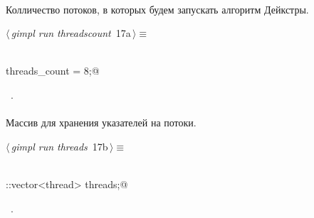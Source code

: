 \documentclass[12pt]{article}
\begin{document}
\paragraph{}
Колличество потоков, в которых будем запускать алгоритм Дейкстры.
\begin{flushleft} \small
\begin{minipage}{\linewidth}\label{scrap27}\raggedright\small
{} $\langle\,${\itshape gimpl run threadscount}\nobreak\ {\footnotesize {17a}}$\,\rangle\equiv$
\vspace{-1ex}
\begin{list}{}{} \item
\mbox{}\verb@@\\
\mbox{}\verb@int threads_count = 8;@\\
\mbox{}\verb@@{\NWsep}
\end{list}
\vspace{-1.5ex}
\footnotesize
\begin{list}{}{\setlength{\itemsep}{-\parsep}\setlength{\itemindent}{-\leftmargin}}
\item \NWtxtMacroRefIn\ .

\item{}
\end{list}
\end{minipage}\vspace{4ex}
\end{flushleft}
\paragraph{}
Массив для хранения указателей на потоки.
\begin{flushleft} \small
\begin{minipage}{\linewidth}\label{scrap28}\raggedright\small
{} $\langle\,${\itshape gimpl run threads}\nobreak\ {\footnotesize {17b}}$\,\rangle\equiv$
\vspace{-1ex}
\begin{list}{}{} \item
\mbox{}\verb@@\\
\mbox{}\verb@std::vector<thread> threads;@\\
\mbox{}\verb@@{\NWsep}
\end{list}
\vspace{-1.5ex}
\footnotesize
\begin{list}{}{\setlength{\itemsep}{-\parsep}\setlength{\itemindent}{-\leftmargin}}
\item \NWtxtMacroRefIn\ .

\item{}
\end{list}
\end{minipage}\vspace{4ex}
\end{flushleft}
\end{document}
